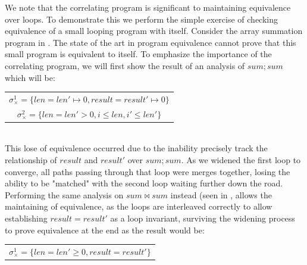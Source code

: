 We note that the correlating program is significant to maintaining equivalence over loops. To demonstrate this we perform the simple exercise of checking equivalence of a small looping program with itself. Consider the array summation program in . The state of the art in program equivalence cannot prove that this small program is equivalent to itself. To emphasize the importance of the correlating program, we will first show the result of an analysis of $sum;sum$ which will be:
\\
\begin{tabular}{c}
$\sigma_{\times}^1 = \{len = len' \mapsto 0, result = result' \mapsto 0\}$
\\
$\sigma_{\times}^2 = \{len = len' > 0, i \leq len, i' \leq len'\}$
\end{tabular}
\\

This lose of equivalence occurred due to the inability precisely track the relationship of $result$ and $result'$ over $sum;sum$. As we widened the first loop to converge, all paths passing through that loop were merges together, losing the ability to be "matched" with the second loop waiting further down the road. Performing the same analysis on $sum \bowtie sum$ instead (seen in , allows the maintaining of equivalence, as the loops are interleaved correctly to allow establishing $result = result'$ as a loop invariant, surviving the widening process to prove equivalence at the end as the result would be:
\\
\begin{tabular}{c}
$\sigma_{\times}^1 = \{len = len' \geq 0, result = result'\}$
\end{tabular}
\\

